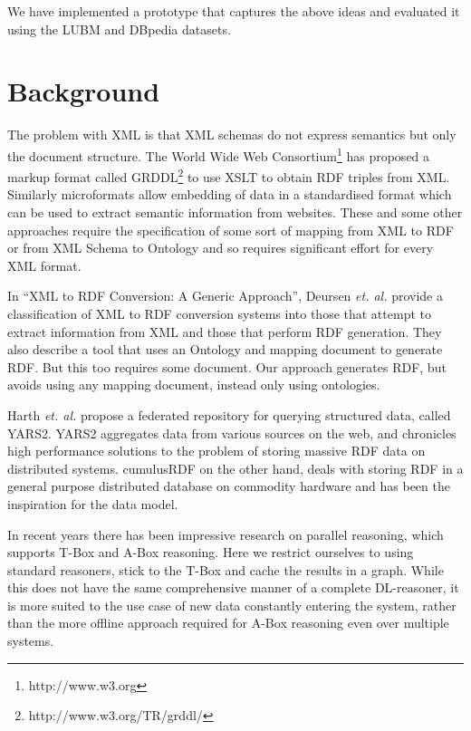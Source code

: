 \documentclass[journal]{IEEEtran}
\begin{document}
We have implemented a prototype that captures the above ideas and evaluated it
using the LUBM\cite{Guo05lubm} and DBpedia\cite{Auer07dbpedia} datasets.

\section{Background}
\label{sec:background}

The problem with XML is that XML schemas do not express semantics but only the
document structure.  The World Wide Web Consortium\footnote{http://www.w3.org}
has proposed a markup format called GRDDL\footnote{http://www.w3.org/TR/grddl/}
to use XSLT to obtain RDF triples from XML. Similarly
microformats\cite{Khare:06} allow embedding of data in a standardised format
which can be used to extract semantic information from websites. These and some
other approaches\cite{Akh08xsp} require the specification
of some sort of mapping from XML to RDF or from XML Schema to Ontology and so
requires significant effort for every XML format.

In ``XML to RDF Conversion: A Generic Approach''\cite{Deur08xml},  Deursen
\emph{et. al.} provide a classification of XML to RDF conversion systems into
those that attempt to extract information from XML and those that perform RDF
generation. They also describe a tool that uses an Ontology and mapping
document to generate RDF. But this too requires some document. Our approach
generates RDF, but avoids using any mapping document, instead only using
ontologies.

Harth \emph{et. al.} propose a federated repository for querying structured
data, called YARS2\cite{Harth07yars2}. YARS2 aggregates data from various
sources on the web, and chronicles high performance solutions to the problem of
storing massive RDF data on distributed systems. cumulusRDF\cite{ladwig:11} on
the other hand, deals with storing RDF in a general purpose distributed
database on commodity hardware and has been the inspiration for the data model.

In recent years there has been impressive research on parallel
reasoning\cite{Weaver09par}\cite{Urb09sca}, which supports T-Box and A-Box
reasoning. Here we restrict ourselves to using standard reasoners, stick to the
T-Box and cache the results in a graph. While this does not have the same
comprehensive manner of a complete DL-reasoner, it is more suited to the use
case of new data constantly entering the system, rather than the more offline
approach required for A-Box reasoning even over multiple systems.
\end{document}
